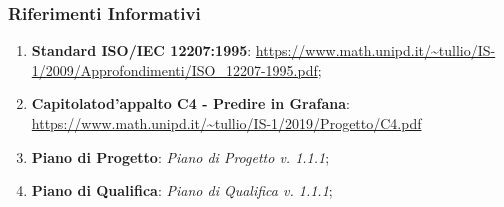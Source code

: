 \subsubsection{Riferimenti Informativi}
\begin{enumerate}
	\item \textbf{Standard ISO/IEC 12207:1995}: 
	\url{https://www.math.unipd.it/~tullio/IS-1/2009/Approfondimenti/ISO_12207-1995.pdf};
	\item \textbf{Capitolato\glosp d'appalto C4 - Predire in Grafana}: \url{https://www.math.unipd.it/~tullio/IS-1/2019/Progetto/C4.pdf}
	\item \textbf{Piano di Progetto}: \textit{Piano di Progetto v. 1.1.1};
	\item \textbf{Piano di Qualifica}: \textit{Piano di Qualifica v. 1.1.1};

	
	
	
	
	
	
\end{enumerate}


